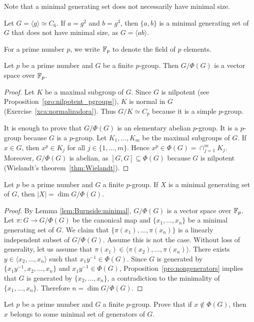 Note that a minimal generating set does not necessarily have minimal size. 
	
\begin{example}
Let $G=\langle g\rangle\simeq C_6$.  If $a=g^2$ and 
$b=g^3$, then $\{a,b\}$ is a minimal generating set of $G$ that does not have
minimal size, as $G=\langle ab\rangle$.
\end{example}
	
For a prime number $p$, we write $\mathbb{F}_p$ to denote the field of $p$ elements. 

\begin{lemma}
\label{lem:Burnside:minimal}
Let $p$ be a prime number and 
$G$ be a finite $p$-group. Then $G/\Phi(G)$ is a vector space over $\mathbb{F}_p$.
\end{lemma}

\begin{proof}
Let $K$ be a maximal subgroup of $G$. Since $G$ is nilpotent 
(see Proposition~\ref{pro:nilpotent_pgroups}), 
$K$ is normal in $G$ (Exercise~\ref{xca:normalizadora}). 
Thus $G/K\simeq C_p$ because it is a simple $p$-group. 
	
It is enough to prove that $G/\Phi(G)$ is an elementary abelian $p$-group. It is a 
$p$-group because $G$ is a $p$-group. Let $K_1,\dots,K_m$ be the maximal subgroups 
of $G$. If $x\in G$, then $x^p\in K_j$ for all $j\in\{1,\dots,m\}$. Hence 
$x^p\in\Phi(G)=\cap_{j=1}^m K_j$. Moreover,  $G/\Phi(G)$ is abelian, as 
$[G,G]\subseteq \Phi(G)$ because $G$ is nilpotent (Wielandt's theorem~\ref{thm:Wielandt}). 
\end{proof}

\begin{theorem}[Burnside]
\label{thm:Burnside:basis}
Let $p$ be a prime number and $G$ a finite $p$-group. If $X$ is a minimal 
generating set of $G$, then $|X|=\dim G/\Phi(G)$. 
\end{theorem}

\begin{proof}
By Lemma \ref{lem:Burnside:minimal}, $G/\Phi(G)$ is a vector space over $\mathbb{F}_p$. 
Let $\pi\colon G\to G/\Phi(G)$ be the canonical map and 
$\{x_1,\dots,x_n\}$ be a minimal generating set of $G$.
We claim that $\{\pi(x_1),\dots,\pi(x_n)\}$ is a linearly independent subset of $G/\Phi(G)$. 
Assume this is not the case. Without loss of generality, let us assume that 
$\pi(x_1)\in\langle \pi(x_2),\dots,\pi(x_n)\rangle$. There exists $y\in
\langle x_2,\dots,x_n\rangle$ such that $x_1y^{-1}\in\Phi(G)$. Since $G$ is generated by 
$\{x_1y^{-1},x_2,\dots,x_n\}$ and $x_1y^{-1}\in\Phi(G)$, Proposition~\ref{pro:nongenerators}
implies that $G$ is generated by 
$\{x_2,\dots,x_n\}$, a contradiction to the minimality of $\{x_1,\dots,x_n\}$. 
Therefore $n=\dim G/\Phi(G)$.
\end{proof}


\begin{exercise}
Let $p$ be a prime number and $G$ a finite $p$-group. Prove that if $x\not\in\Phi(G)$, then 
$x$ belongs to some minimal set of generators of $G$. 
\end{exercise}
